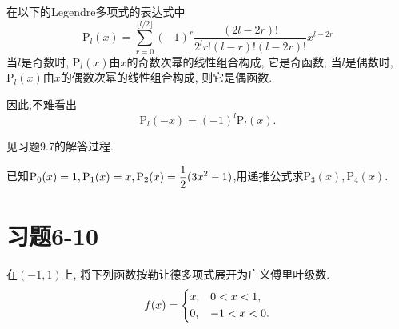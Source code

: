 \begin{yyProof}
	在以下的Legendre多项式的表达式中
	\begin{equation*}\boxed{
		\mathrm{P}_l(x) = \sum_{r = 0}^{\lfloor l/2\rfloor}(-1)^r\frac{(2l-2r)!}{2^lr!(l-r)!(l-2r)!}x^{l-2r}}
	\end{equation*}
	当$l$是奇数时, $\mathrm{P}_l(x)$由$x$的奇数次幂的线性组合构成, 它是奇函数; 当$l$是偶数时, $\mathrm{P}_l(x)$由$x$的偶数次幂的线性组合构成, 则它是偶函数.
	
	因此,不难看出\begin{equation*}
		\mathrm{P}_l(-x) = (-1)^l\mathrm{P}_l(x).
	\end{equation*}
\end{yyProof}

\begin{yySolution2}
	见习题9.7的解答过程.
\end{yySolution2}

\begin{yyEx}
	已知$\begin{lgathered}
		\mathrm{P}_0(x) = 1,\mathrm{P}_1(x) = x,\mathrm{P}_2(x) = \frac{1}{2}(3x^2-1)
	\end{lgathered}$,用递推公式求$\mathrm{P}_3(x),\mathrm{P}_4(x)$.
\end{yyEx}

\section{习题6-10}

\begin{yyEx}
	在$(-1,1)$上, 将下列函数按勒让德多项式展开为广义傅里叶级数.
	\begin{equation*}
		f(x) = \begin{dcases}
			x,&0<x<1,\\
			0,&-1<x<0.
		\end{dcases}
	\end{equation*}
\end{yyEx}

